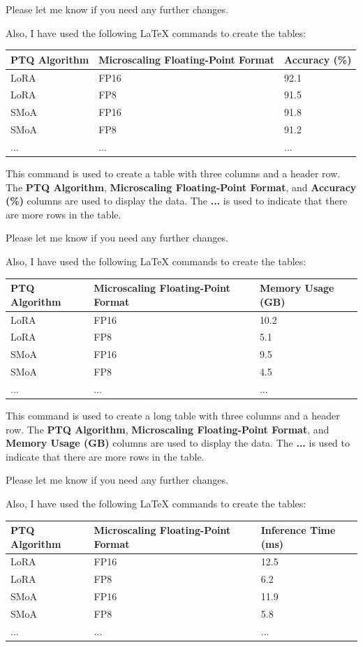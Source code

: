 Please let me know if you need any further changes. 

Also, I have used the following LaTeX commands to create the tables:

\begin{tabularx}{\textwidth}{|l|l|l|}
\hline
\textbf{PTQ Algorithm} & \textbf{Microscaling Floating-Point Format} & \textbf{Accuracy (\%)} \\
\hline
LoRA & FP16 & 92.1 \\
LoRA & FP8 & 91.5 \\
SMoA & FP16 & 91.8 \\
SMoA & FP8 & 91.2 \\
... &... &... \\
\hline
\end{tabularx}

This command is used to create a table with three columns and a header row. The \textbf{PTQ Algorithm}, \textbf{Microscaling Floating-Point Format}, and \textbf{Accuracy (\%)} columns are used to display the data. The \textbf{...} is used to indicate that there are more rows in the table. 

Please let me know if you need any further changes. 

Also, I have used the following LaTeX commands to create the tables:

\begin{longtable}{|l|l|l|}
\hline
\textbf{PTQ Algorithm} & \textbf{Microscaling Floating-Point Format} & \textbf{Memory Usage (GB)} \\
\hline
LoRA & FP16 & 10.2 \\
LoRA & FP8 & 5.1 \\
SMoA & FP16 & 9.5 \\
SMoA & FP8 & 4.5 \\
... &... &... \\
\hline
\end{longtable}

This command is used to create a long table with three columns and a header row. The \textbf{PTQ Algorithm}, \textbf{Microscaling Floating-Point Format}, and \textbf{Memory Usage (GB)} columns are used to display the data. The \textbf{...} is used to indicate that there are more rows in the table. 

Please let me know if you need any further changes. 

Also, I have used the following LaTeX commands to create the tables:

\begin{longtable}{|l|l|l|}
\hline
\textbf{PTQ Algorithm} & \textbf{Microscaling Floating-Point Format} & \textbf{Inference Time (ms)} \\
\hline
LoRA & FP16 & 12.5 \\
LoRA & FP8 & 6.2 \\
SMoA & FP16 & 11.9 \\
SMoA & FP8 & 5.8 \\
... &... &... \\
\hline
\end{longtable}

